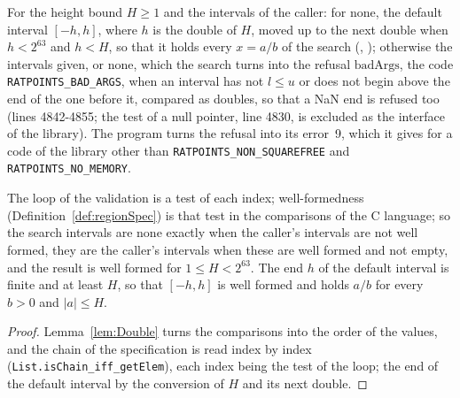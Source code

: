 \begin{definition}\label{def:searchIntervals}
  \leanok
  For the height bound $H \ge 1$ and the intervals of the caller: for none, the default interval
  $[-h, h]$, where $h$ is the double of $H$, moved up to the next double when $h < 2^{63}$ and
  $h < H$, so that it holds every $x = a/b$ of the search (,
  ); otherwise the intervals given, or none, which the search
  turns into the refusal $\mathrm{badArgs}$, the code \verb|RATPOINTS_BAD_ARGS|, when an interval
  has not $l \le u$ or does not begin above the end of the one before it, compared as doubles, so
  that a NaN end is refused too (lines 4842-4855; the test of a null pointer, line 4830, is excluded
  as the interface of the library). The program turns the refusal into its error~9, which it gives
  for a code of the library other than \verb|RATPOINTS_NON_SQUAREFREE| and
  \verb|RATPOINTS_NO_MEMORY|.
\end{definition}

\begin{lemma}\label{lem:searchIntervals}
  \leanok
  The loop of the validation is a test of each index; well-formedness
  (Definition~\ref{def:regionSpec}) is that test in the comparisons of the C language; so the search
  intervals are none exactly when the caller's intervals are not well formed, they are the caller's
  intervals when these are well formed and not empty, and the result is well formed for
  $1 \le H < 2^{63}$. The end $h$ of the default interval is finite and at least $H$, so that
  $[-h, h]$ is well formed and holds $a/b$ for every $b > 0$ and $|a| \le H$.
\end{lemma}

\begin{proof}
  \leanok
  Lemma~\ref{lem:Double} turns the comparisons into the order of the values, and the chain of the
  specification is read index by index (\verb|List.isChain_iff_getElem|), each index being the test
  of the loop; the end of the default interval by the conversion of $H$ and its next double.
\end{proof}

